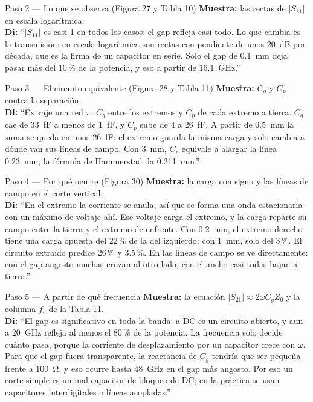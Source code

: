 \documentclass[11pt,letterpaper]{article}
\begin{document}
\begin{paso}{Paso 2 --- Lo que se observa (Figura 27 y Tabla 10)}
\textbf{Muestra:} las rectas de $|S_{21}|$ en escala logarítmica.\\
\textbf{Di:} ``$|S_{11}|$ es casi 1 en todos los casos: el gap refleja casi todo. Lo que cambia es la transmisión: en escala logarítmica son rectas con pendiente de unos 20~dB por década, que es la firma de un capacitor en serie. Solo el gap de \SI{0.1}{mm} deja pasar más del 10\,\% de la potencia, y eso a partir de \SI{16.1}{GHz}.''
\end{paso}

\begin{paso}{Paso 3 --- El circuito equivalente (Figura 28 y Tabla 11)}
\textbf{Muestra:} $C_g$ y $C_p$ contra la separación.\\
\textbf{Di:} ``Extraje una red $\pi$: $C_g$ entre los extremos y $C_p$ de cada extremo a tierra. $C_g$ cae de \SI{33}{fF} a menos de \SI{1}{fF}, y $C_p$ sube de \SI{4}{} a \SI{26}{fF}. A partir de \SI{0.5}{mm} la suma se queda en unos \SI{26}{fF}: el extremo guarda la misma carga y solo cambia a dónde van sus líneas de campo. Con \SI{3}{mm}, $C_p$ equivale a alargar la línea \SI{0.23}{mm}; la fórmula de Hammerstad da \SI{0.211}{mm}.''
\end{paso}

\begin{paso}{Paso 4 --- Por qué ocurre (Figura 30)}
\textbf{Muestra:} la carga con signo y las líneas de campo en el corte vertical.\\
\textbf{Di:} ``En el extremo la corriente se anula, así que se forma una onda estacionaria con un máximo de voltaje ahí. Ese voltaje carga el extremo, y la carga reparte su campo entre la tierra y el extremo de enfrente. Con \SI{0.2}{mm}, el extremo derecho tiene una carga opuesta del 22\,\% de la del izquierdo; con \SI{1}{mm}, solo del 3\,\%. El circuito extraído predice 26\,\% y 3.5\,\%. En las líneas de campo se ve directamente: con el gap angosto muchas cruzan al otro lado, con el ancho casi todas bajan a tierra.''
\end{paso}

\begin{paso}{Paso 5 --- A partir de qué frecuencia}
\textbf{Muestra:} la ecuación $|S_{21}|\approx 2\omega C_gZ_0$ y la columna $f_c$ de la Tabla 11.\\
\textbf{Di:} ``El gap es significativo en toda la banda: a DC es un circuito abierto, y aun a \SI{20}{GHz} refleja al menos el 80\,\% de la potencia. La frecuencia solo decide cuánto pasa, porque la corriente de desplazamiento por un capacitor crece con $\omega$. Para que el gap fuera transparente, la reactancia de $C_g$ tendría que ser pequeña frente a \SI{100}{\ohm}, y eso ocurre hasta \SI{48}{GHz} en el gap más angosto. Por eso un corte simple es un mal capacitor de bloqueo de DC; en la práctica se usan capacitores interdigitales o líneas acopladas.''
\end{paso}
\end{document}
